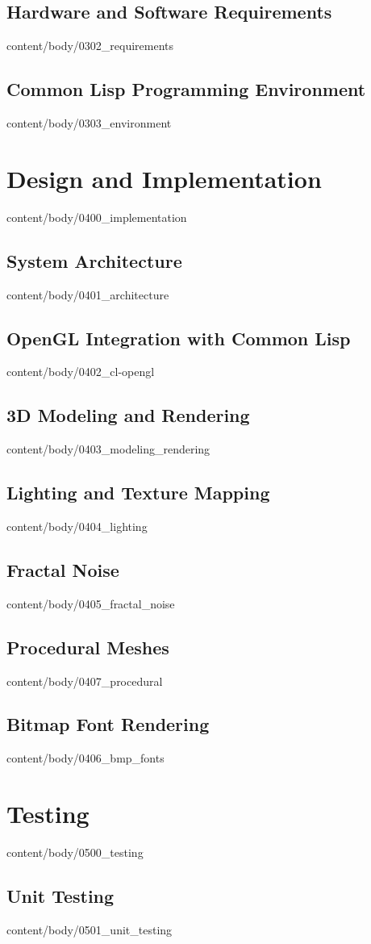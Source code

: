 \documentclass[english, tfg, loc, lof, covers, printable, firstnumbered, epsbased]{tfgtfmthesisuam}
\begin{document}
  \section{Hardware and Software Requirements}{content/body/0302_requirements}
  \section{Common Lisp Programming Environment}{content/body/0303_environment}

\chapter{Design and Implementation}{content/body/0400_implementation}
  \section{System Architecture}{content/body/0401_architecture}
  \section{OpenGL Integration with Common Lisp}{content/body/0402_cl-opengl}
  \section{3D Modeling and Rendering}{content/body/0403_modeling_rendering}
  \section{Lighting and Texture Mapping}{content/body/0404_lighting}
  \section{Fractal Noise}{content/body/0405_fractal_noise}
  \section{Procedural Meshes}{content/body/0407_procedural}
  \section{Bitmap Font Rendering}{content/body/0406_bmp_fonts}

\chapter{Testing}{content/body/0500_testing}
  \section{Unit Testing}{content/body/0501_unit_testing}
\end{document}
